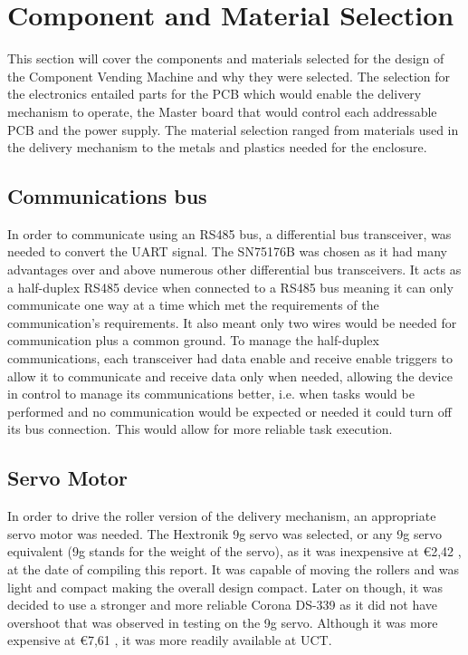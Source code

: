 \documentclass[a4paper,11pt]{article}
\numberwithin{figure}{section}
\numberwithin{table}{section}
\begin{document}
\newpage
\section{Component and Material Selection}\thispagestyle{sectionstart}
This section will cover the components and materials selected for the design of the Component Vending Machine and why they were selected. The selection for the electronics entailed parts for the PCB which would enable the delivery mechanism to operate, the Master board that would control each addressable PCB and the power supply. The material selection ranged from materials used in the delivery mechanism to the metals and plastics needed for the enclosure.

\subsection{Communications bus}
\label{subsec:bus}
In order to communicate using an RS485 bus, a differential bus transceiver, was needed to convert the UART signal. The SN75176B was chosen as it had many advantages over and above numerous other differential bus transceivers. It acts as a half-duplex RS485 device when connected to a RS485 bus meaning it can only communicate one way at a time which met the requirements of the communication's requirements. It also meant only two wires would be needed for communication plus a common ground. To manage the half-duplex communications, each transceiver had data enable and receive enable triggers to allow it to communicate and receive data only when needed, allowing the device in control to manage its communications better, i.e. when tasks would be performed and no communication would be expected or needed it could turn off its bus connection. This would allow for more reliable task execution.

\subsection{Servo Motor}
In order to drive the roller version of the delivery mechanism, an appropriate servo motor was needed. The Hextronik 9g servo was selected, or any 9g servo equivalent (9g stands for the weight of the servo), as it was inexpensive at \euro 2,42 \cite{hobbyking}, at the date of compiling this report. It was capable of moving the rollers and was light and compact making the overall design compact. Later on though, it was decided to use a stronger and more reliable Corona DS-339 as it did not have overshoot that was observed in testing on the 9g servo. Although it was more expensive at \euro 7,61 \cite{hobbyking}, it was more readily available at UCT.
\end{document}
